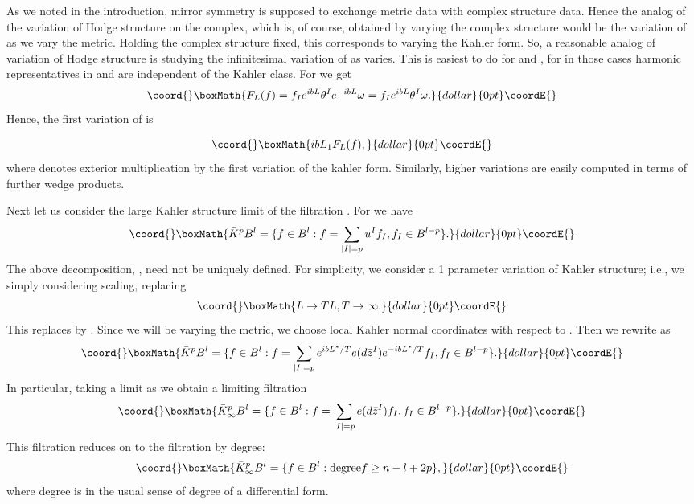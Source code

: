 \documentclass[a4paper,11pt]{amsart}
\begin{document}
As we noted in the introduction, mirror symmetry is supposed to exchange 
metric data with complex structure data.
Hence the analog of the variation of Hodge structure on the \coordHE{} complex, which
is, of course, obtained by varying the complex structure would be the 
variation of \coordHE{} as we vary the metric. Holding the complex structure 
fixed, this corresponds to varying the Kahler form. So, a reasonable
analog of variation of Hodge structure is studying the infinitesimal 
variation of \coordHE{} as \coordHE{} varies. This is easiest to do for \coordHE{} and 
\coordHE{}, for in those cases harmonic representatives in \coordHE{} and 
\coordHE{} are independent of the Kahler class.  
For \coordHE{} we get 
$$\coord{}\boxMath{F_L(f) = f_Ie^{ibL}\theta^Ie^{-ibL}\omega
 = f_Ie^{ibL}\theta^I\omega.}{dollar}{0pt}\coordE{}$$
Hence, the first variation of \coordHE{} is 
 
$$\coord{}\boxMath{ibL_1F_L(f),}{dollar}{0pt}\coordE{}$$
where \coordHE{} denotes exterior multiplication by the first variation
 of the kahler 
form. Similarly, higher variations are easily computed in terms of further wedge
 products. 

Next let us consider the large Kahler structure limit of the filtration
\coordHE{}. For \coordHE{} we have 
$$\coord{}\boxMath{\bar K^pB^l = \{f\in B^l:f = \sum_{|I|=p}u^If_I, f_I\in B^{l-p}\}.}{dollar}{0pt}\coordE{}$$
The above decomposition, \coordHE{}, need not be uniquely defined.
For simplicity, we consider a 1 parameter
variation of Kahler structure; i.e., we simply considering scaling, replacing 
$$\coord{}\boxMath{L\rightarrow TL, T\rightarrow\infty.}{dollar}{0pt}\coordE{}$$
This replaces \coordHE{} by \coordHE{}. Since we will be varying the metric, we 
choose local Kahler normal coordinates \coordHE{} with respect to \coordHE{}. Then 
we rewrite \coordHE{} as 
$$\coord{}\boxMath{\bar K^pB^l = \{f\in B^l:f = \sum_{|I|=p}e^{ibL^*/T}e(d\bar{z}^I)e^{-ibL^*/T}f_I, f_I\in B^{l-p}\}.}{dollar}{0pt}\coordE{}$$ 
In particular, taking a limit as \coordHE{} we obtain a limiting 
filtration 
$$\coord{}\boxMath{\bar K^p_{\infty}B^l = \{f\in B^l:f = \sum_{|I|=p}e(d\bar{z}^I)f_I, f_I\in B^{l-p}\}.}{dollar}{0pt}\coordE{}$$  
This filtration reduces on \coordHE{} to the filtration by degree: 
$$\coord{}\boxMath{\bar K^p_{\infty}B^l = \{f\in B^l: \mbox{degree}f\geq n-l+2p\},}{dollar}{0pt}\coordE{}$$ 
where degree is in the usual sense of degree of a differential form. 
 
\end{document}
